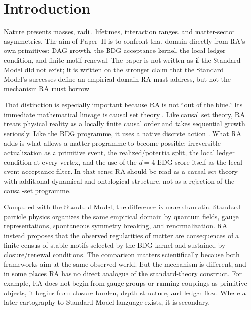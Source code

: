 \documentclass[11pt]{article}
\begin{document}
\section{Introduction}

Nature presents masses, radii, lifetimes, interaction ranges, and matter-sector asymmetries. The aim of Paper~II is to confront that domain directly from RA's own primitives: DAG growth, the BDG acceptance kernel, the local ledger condition, and finite motif renewal. The paper is not written as if the Standard Model did not exist; it is written on the stronger claim that the Standard Model's successes define an empirical domain RA must address, but not the mechanism RA must borrow.

That distinction is especially important because RA is not ``out of the blue.'' Its immediate mathematical lineage is causal set theory \cite{Bombelli1987,Sorkin1997,Rideout2000}. Like causal set theory, RA treats physical reality as a locally finite causal order and takes sequential growth seriously. Like the BDG programme, it uses a native discrete action \cite{Benincasa2010,Dowker2013}. What RA adds is what allows a matter programme to become possible: irreversible actualization as a primitive event, the realized/potentia split, the local ledger condition at every vertex, and the use of the $d=4$ BDG score itself as the local event-acceptance filter. In that sense RA should be read as a causal-set theory with additional dynamical and ontological structure, not as a rejection of the causal-set programme.

Compared with the Standard Model, the difference is more dramatic. Standard particle physics organizes the same empirical domain by quantum fields, gauge representations, spontaneous symmetry breaking, and renormalization. RA instead proposes that the observed regularities of matter are consequences of a finite census of stable motifs selected by the BDG kernel and sustained by closure/renewal conditions. The comparison matters scientifically because both frameworks aim at the same observed world. But the mechanism is different, and in some places RA has no direct analogue of the standard-theory construct. For example, RA does not begin from gauge groups or running couplings as primitive objects; it begins from closure burden, depth structure, and ledger flow. Where a later cartography to Standard Model language exists, it is secondary.
\end{document}
